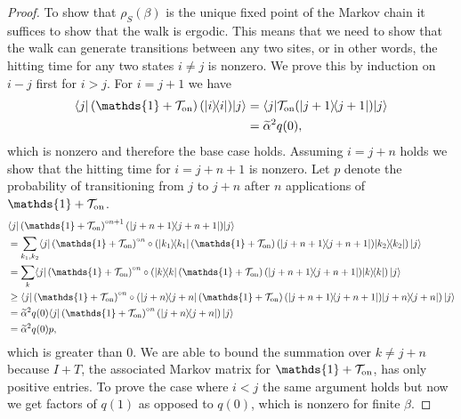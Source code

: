 \documentclass[
 amsmath,amssymb,
 aps,
onecolumn, 
nofootinbib]{revtex4-2}
\newcommand{\on}{\rm on}
\newcommand{\ket}[1]{|#1\rangle}
\newcommand{\bra}[1]{\langle #1|}
\newcommand{\ketbra}[2]{| #1\rangle\! \langle #2|}
\newcommand{\TT}{\mathcal{T}}
\newcommand{\identity}{\mathds{1}}
\begin{document}
\begin{proof}
    To show that $\rho_S(\beta)$ is the unique fixed point of the Markov chain it suffices to  show that the walk is ergodic. This means that we need to show that the walk can generate transitions between any two sites, or in other words, the hitting time for any two states $i \neq j$ is nonzero. We prove this by induction on $i - j$ first for $i > j$. For $i = j + 1$ we have
    \begin{align}
        \bra{j} \left( \identity + \TT_{\on} \right)(\ketbra{i}{i}) \ket{j} &= \bra{j} \TT_{\on}(\ketbra{j + 1}{j + 1}) \ket{j} \\
        &= \widetilde{\alpha}^2 q(0),
    \end{align} 
    which is nonzero and therefore the base case holds. Assuming $i = j + n$ holds we show that the hitting time for $i = j + n + 1$ is nonzero. Let $p$ denote the probability of transitioning from $j$ to $j + n$ after $n$ applications of $\identity + \TT_{\on}$. 
    \begin{align}
        &\bra{j } \left(\identity + \TT_{\on} \right)^{\circ n + 1} (\ketbra{j+ n + 1}{j+ n + 1}) \ket{j } \nonumber \\
        &= \sum_{k_1, k_2}\bra{j } \left(\identity + \TT_{\on} \right)^{\circ n} \circ \left(\ketbra{k_1}{k_1}\left(\identity + \TT_{\on} \right) (\ketbra{j+ n + 1}{j+ n + 1}) \ketbra{k_2}{k_2} \right) \ket{j } \\
        &= \sum_{k}\bra{j } \left(\identity + \TT_{\on} \right)^{\circ n} \circ \left(\ketbra{k}{k}\left(\identity + \TT_{\on} \right) (\ketbra{j+ n + 1}{j+ n + 1}) \ketbra{k}{k} \right) \ket{j } \\
        &\ge \bra{j } \left(\identity + \TT_{\on} \right)^{\circ n} \circ \left(\ketbra{j + n}{j + n}\left(\identity + \TT_{\on} \right) (\ketbra{j+ n + 1}{j+ n + 1}) \ketbra{j + n}{j + n} \right) \ket{j } \\
        &= \widetilde{\alpha}^2 q(0) \bra{j } \left(\identity + \TT_{\on} \right)^{\circ n} \left(\ketbra{j + n}{j + n}\right)\ket{j } \\
        &= \widetilde{\alpha}^2 q(0) p,
    \end{align}
    which is greater than 0. We are able to bound the summation over $k \neq j + n$ because $I + T$, the associated Markov matrix for $\identity + \TT_{\on}$, has only positive entries. To prove the case where $i < j$ the same argument holds but now we get factors of $q(1)$ as opposed to $q(0)$, which is nonzero for finite $\beta$. 


\end{proof}
\end{document}
